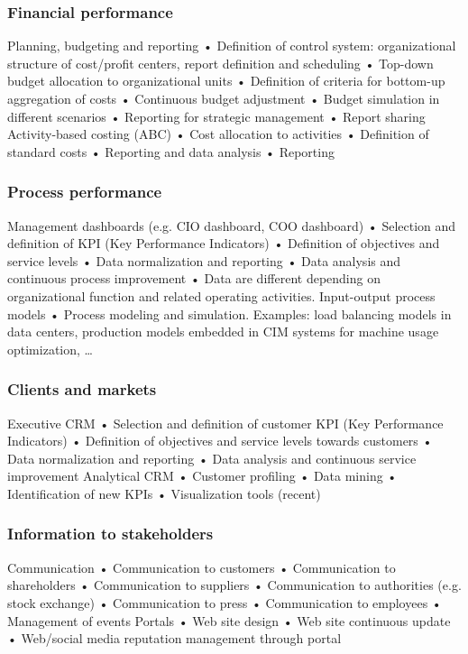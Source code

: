 \subsubsection{Financial performance}
Planning,
budgeting and
reporting
• Definition of control system: organizational structure of cost/profit
centers, report definition and scheduling
• Top-down budget allocation to organizational units
• Definition of criteria for bottom-up aggregation of costs
• Continuous budget adjustment
• Budget simulation in different scenarios
• Reporting for strategic management
• Report sharing
Activity-based
costing (ABC)
• Cost allocation to activities
• Definition of standard costs
• Reporting and data analysis
• Reporting
\subsubsection{Process performance}
Management
dashboards (e.g.
CIO dashboard,
COO dashboard)
• Selection and definition of KPI (Key Performance
Indicators)
• Definition of objectives and service levels
• Data normalization and reporting
• Data analysis and continuous process improvement
• Data are different depending on organizational function
and related operating activities.
Input-output
process models
• Process modeling and simulation. Examples: load
balancing models in data centers, production models
embedded in CIM systems for machine usage
optimization, …
\subsubsection{Clients and markets}
Executive CRM • Selection and definition of customer KPI (Key Performance
Indicators)
• Definition of objectives and service levels towards customers
• Data normalization and reporting
• Data analysis and continuous service improvement
Analytical CRM • Customer profiling
• Data mining
• Identification of new KPIs
• Visualization tools (recent)
\subsubsection{Information to stakeholders}
Communication • Communication to customers
• Communication to shareholders
• Communication to suppliers
• Communication to authorities (e.g. stock
exchange)
• Communication to press
• Communication to employees
• Management of events
Portals • Web site design
• Web site continuous update
• Web/social media reputation management
through portal

